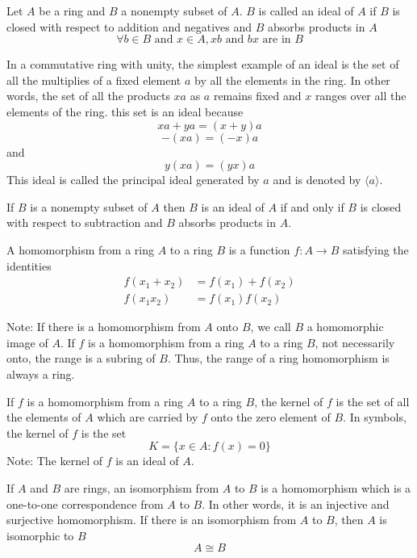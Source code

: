 \documentclass[12pt]{article}
\begin{document}
\begin{definition} Let $A$ be a ring and $B$ a nonempty subset of $A$. $B$ is called an ideal of $A$ if $B$ is closed with respect to addition and negatives and $B$ absorbs products in $A$
$$ \forall b \in B \text{ and } x \in A, xb \text{ and } bx \text{ are in } B $$ 
\end{definition} 

\begin{example} In a commutative ring with unity, the simplest example of an ideal is the set of all the multiplies of a fixed element $a$ by all the elements in the ring. In other words, the set of all the products $xa$ as $a$ remains fixed and $x$ ranges over all the elements of the ring. this set is an ideal because $$xa + ya = (x+y)a$$ $$-(xa) = (-x)a$$ and $$y(xa) = (yx)a$$ This ideal is called the principal ideal generated by $a$ and is denoted by $\langle a \rangle$. \end{example}

\begin{definition} If $B$ is a nonempty subset of $A$ then $B$ is an ideal of $A$ if and only if $B$ is closed with respect to subtraction and $B$ absorbs products in $A$. \end{definition} 

\begin{definition} A homomorphism from a ring $A$ to a ring $B$ is a function $f: A \to B$ satisfying the identities $$ \begin{aligned} f(x_1 + x_2) &= f(x_1) + f(x_2) \\ f(x_1x_2) &= f(x_1)f(x_2) \end{aligned} $$ \end{definition} 

Note: If there is a homomorphism from $A$ onto $B$, we call $B$ a homomorphic image of $A$. If $f$ is a homomorphism from a ring $A$ to a ring $B$, not necessarily onto, the range is a subring of $B$. Thus, the range of a ring homomorphism is always a ring. 

\begin{definition} If $f$ is a homomorphism from a ring $A$ to a ring $B$, the kernel of $f$ is the set of all the elements of $A$ which are carried by $f$ onto the zero element of $B$. In symbols, the kernel of $f$ is the set $$ K = \{ x \in A : f(x) = 0\} $$ Note: The kernel of $f$ is an ideal of $A$. \end{definition} 

\begin{definition} If $A$ and $B$ are rings, an isomorphism from $A$ to $B$ is a homomorphism which is a one-to-one correspondence from $A$ to $B$. In other words, it is an injective and surjective homomorphism. If there is an isomorphism from $A$ to $B$, then $A$ is isomorphic to $B$ $$ A \cong B$$ \end{definition} 
\end{document}
